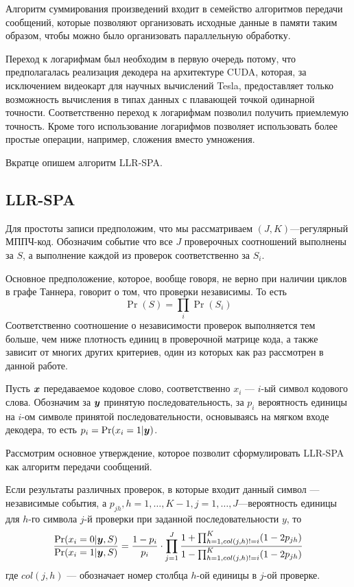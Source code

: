  Алгоритм суммирования произведений входит в семейство алгоритмов передачи сообщений, 
 которые позволяют организовать исходные данные в памяти
 таким образом, чтобы можно было организовать параллельную обработку. 
 
 Переход к логарифмам был необходим в первую очередь потому, что предполагалась реализация декодера на 
 архитектуре CUDA, которая, за исключением видеокарт для научных вычислений Tesla, предоставляет только 
 возможность вычисления в типах данных с плавающей точкой одинарной точности. Соответственно переход
 к логарифмам позволил получить приемлемую точность. Кроме того использование логарифмов позволяет
 использовать более простые операции, например, сложения вместо умножения.
 
 Вкратце опишем алгоритм LLR-SPA.
 
 \subsection{LLR-SPA}
 
 Для простоты записи предположим, что мы рассматриваем $(J,K)$---регулярный МППЧ-код.
 Обозначим событие что все $J$ проверочных соотношений выполнены за $S$, а выполнение
 каждой из проверок соответственно за $S_i$.
 
  Основное предположение, которое, вообще говоря, не верно
 при наличии циклов в графе Таннера, говорит о том, что проверки независимы. То есть
 \[
 \Pr(S)=\prod_i \Pr(S_i)
 \]
 Соответственно соотношение о независимости проверок выполняется тем больше, чем ниже
 плотность единиц в проверочной матрице кода, а также зависит от многих других критериев, один из
 которых как раз рассмотрен в данной работе.

Пусть $\boldsymbol{x}$ передаваемое кодовое слово, соответственно $x_i$ --- $i$-ый символ кодового слова.
Обозначим за $\boldsymbol{y}$ принятую последовательность, за $p_i$ вероятность единицы на $i$-ом символе
принятой последовательности, основываясь на мягком входе декодера, то есть $p_i = \Pr(x_i=1|\boldsymbol{y})$.

Рассмотрим основное утверждение, которое позволит сформулировать LLR-SPA как алгоритм передачи
сообщений.

\begin{theorem}
	\cite{kudryashov-codingtheory}
	Если результаты различных проверок, в которые входит данный символ --- независимые события, а 
	$p_{jh}, h=1,\ldots,K-1, j=1,\ldots,J$---вероятность единицы для $h$-го символа $j$-й проверки при
	заданной последовательности $y$, то
	\begin{equation}
		\frac{\Pr(x_i=0|\boldsymbol{y},S)}{\Pr(x_i=1|\boldsymbol{y},S)}=\frac{1-p_i}{p_i} \cdot \prod_{j=1}^{J}
		\frac{1+\prod_{h=1,col(j,h)!=i}^{K}(1-2p_{jh})}{1-\prod_{h=1,col(j,h)!=i}^{K}(1-2p_{jh})}
	\end{equation}
	где $col(j,h)$ --- обозначает номер столбца $h$-ой единицы в $j$-ой проверке.
\end{theorem}

